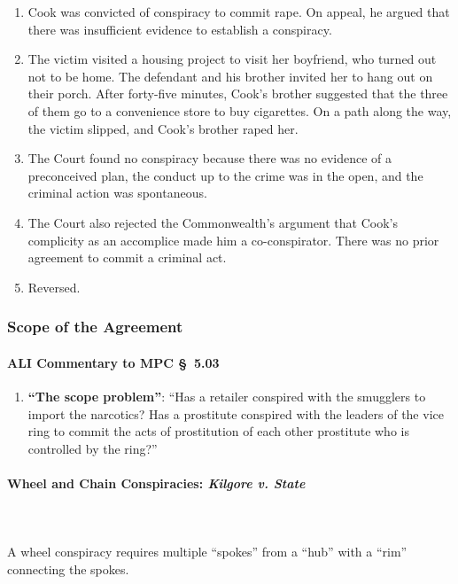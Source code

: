 \begin{enumerate}
    \item Cook was convicted of conspiracy to commit rape. On appeal, he 
    argued that there was insufficient evidence to establish a conspiracy.
    \item The victim visited a housing project to visit her boyfriend, who 
    turned out not to be home. The defendant and his brother invited her to 
    hang out on their porch. After forty-five minutes, Cook's brother 
    suggested that the three of them go to a convenience store to buy 
    cigarettes. On a path along the way, the victim slipped, and Cook's 
    brother raped her.
    \item The Court found no conspiracy because there was no evidence of a 
    preconceived plan, the conduct up to the crime was in the open, and the 
    criminal action was spontaneous.
    \item The Court also rejected the Commonwealth's argument that Cook's 
    complicity as an accomplice made him a co-conspirator. There was no prior 
    agreement to commit a criminal act.
    \item Reversed.
\end{enumerate}

\subsubsection{Scope of the Agreement}

\paragraph{ALI Commentary to MPC \S\ 5.03}

\begin{enumerate}
    \item \textbf{``The scope problem''}: ``Has a retailer conspired with the 
    smugglers to import the narcotics? Has a prostitute conspired with the 
    leaders of the vice ring to commit the acts of prostitution of each other 
    prostitute who is controlled by the ring?''
\end{enumerate}

\paragraph{Wheel and Chain Conspiracies: \emph{Kilgore v. State}}
~\\\\
A wheel conspiracy requires multiple ``spokes'' from a ``hub'' with a ``rim'' 
connecting the spokes.

